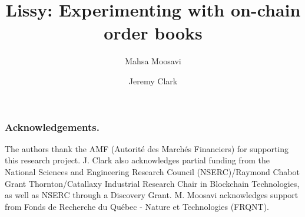 \documentclass[envcountsect]{llncs}
\begin{document}
\frontmatter
\mainmatter

\title{\Large \bf Lissy: Experimenting with on-chain order books}



\author{Mahsa Moosavi \and Jeremy Clark}



\maketitle











\subsubsection*{Acknowledgements.}  The authors thank the AMF (Autorité des Marchés Financiers) for supporting this research project. J. Clark also acknowledges partial funding from the National Sciences and Engineering Research Council (NSERC)/Raymond Chabot Grant Thornton/Catallaxy Industrial Research Chair in Blockchain Technologies, as well as NSERC through a Discovery Grant. M. Moosavi acknowledges support from Fonds de Recherche du Québec - Nature et Technologies (FRQNT).








%
\end{document}
